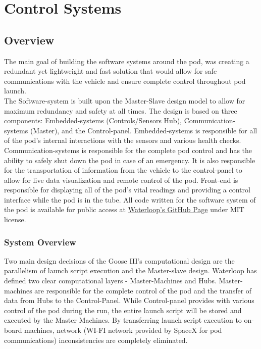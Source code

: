 \chapter{Control Systems}
\label{ch:control-systems}
\section{Overview}
\newcommand{\itc}{I$^2$C}
The main goal of building the software systems around the pod, was creating a redundant yet lightweight and fast solution that would allow for safe communications with the vehicle and ensure complete control throughout pod launch.\\

The Software-system is built upon the Master-Slave design model to allow for maximum redundancy and safety at all times. The design is based on three components: Embedded-systems (Controls/Sensors Hub), Communication-systems (Master), and the Control-panel. 
Embedded-systems is responsible for all of the pod's internal interactions with the sensors and various health checks. 
Communication-systems is responsible for the complete pod control and has the ability to safely shut down the pod in case of an emergency. It is also responsible for the transportation of information from the vehicle to the control-panel to allow for live data visualization and remote control of the pod. 
Front-end is responsible for displaying all of the pod's vital readings and providing a control interface while the pod is in the tube. All code written for the software system of the pod is available for public access at \href{https://github.com/teamwaterloop}{Waterloop's GitHub Page} under MIT license.

\subsection{System Overview}
Two main design decisions of the Goose III's computational design are the parallelism of launch script execution and the Master-slave design. Waterloop has defined two clear computational layers - Master-Machines and Hubs. Master-machines are responsible for the complete control of the pod and the transfer of data from Hubs to the Control-Panel. While Control-panel provides with various control of the pod during the run, the entire launch script will be stored and executed by the Master Machines. By transferring launch script execution to on-board machines, network (WI-FI network provided by SpaceX for pod communications) inconsistencies are completely eliminated.

